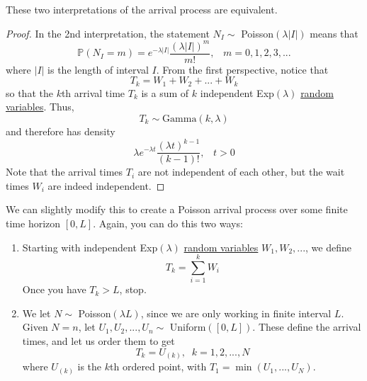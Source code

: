   \begin{theorem}
    \label{thm:equivalence-of-the-two-arrival-process}
    These two interpretations of the arrival process are equivalent. 
  \end{theorem}
  \begin{proof}
    In the 2nd interpretation, the statement $N_I \sim$ Poisson$(\lambda |I|)$ means that 
    \begin{equation}
      \mathbb{P}(N_I = m) = e^{-\lambda |I|} \frac{(\lambda |I|)^m}{m!}, \;\;\; m = 0, 1, 2, 3, ...
    \end{equation}
    where $|I|$ is the length of interval $I$. From the first perspective, notice that 
    \begin{equation}
      T_k = W_1 + W_2 + ... + W_k
    \end{equation}
    so that the $k$th arrival time $T_k$ is a sum of $k$ independent Exp$(\lambda)$ \hyperref[def:random-variable]{random variables}. Thus, 
    \begin{equation}
      T_k \sim \text{Gamma}(k, \lambda)
    \end{equation}
    and therefore has density
    \begin{equation}
    \lambda e^{-\lambda t} \frac{(\lambda t)^{k-1}}{(k-1)!}, \;\;\; t>0
    \end{equation}
    Note that the arrival times $T_i$ are not independent of each other, but the wait times $W_i$ are indeed independent. 
  \end{proof}

  We can slightly modify this to create a Poisson arrival process over some finite time horizon $[0, L]$. Again, you can do this two ways: 
  \begin{enumerate}
    \item Starting with independent Exp$(\lambda)$ \hyperref[def:random-variable]{random variables} $W_1, W_2, ...$, we define
    \begin{equation}
      T_k = \sum_{i=1}^k W_i
    \end{equation}
    Once you have $T_k > L$, stop. 
    \item We let $N \sim$ Poisson$(\lambda L)$, since we are only working in finite interval $L$. Given $N = n$, let $U_1, U_2, ..., U_n \sim$ Uniform$([0, L])$. These define the arrival times, and let us order them to get
    \begin{equation}
      T_k = U_{(k)}, \;\; k = 1, 2, ..., N
    \end{equation}
    where $U_{(k)}$ is the $k$th ordered point, with $T_1 = \min(U_1, ..., U_N)$. 
  \end{enumerate}

